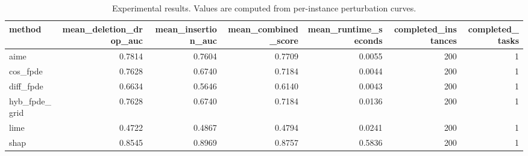 \begin{table}[t]
\caption{Experimental results. Values are computed from per-instance perturbation curves.}
\label{tab:main_results_computed}
\centering
\begin{tabular}{lrrrrrr}
\toprule
method & mean\_deletion\_drop\_auc & mean\_insertion\_auc & mean\_combined\_score & mean\_runtime\_seconds & completed\_instances & completed\_tasks \\
\midrule
aime & 0.7814 & 0.7604 & 0.7709 & 0.0055 & 200 & 1 \\
cos\_fpde & 0.7628 & 0.6740 & 0.7184 & 0.0044 & 200 & 1 \\
diff\_fpde & 0.6634 & 0.5646 & 0.6140 & 0.0043 & 200 & 1 \\
hyb\_fpde\_grid & 0.7628 & 0.6740 & 0.7184 & 0.0136 & 200 & 1 \\
lime & 0.4722 & 0.4867 & 0.4794 & 0.0241 & 200 & 1 \\
shap & 0.8545 & 0.8969 & 0.8757 & 0.5836 & 200 & 1 \\
\bottomrule
\end{tabular}

\end{table}
